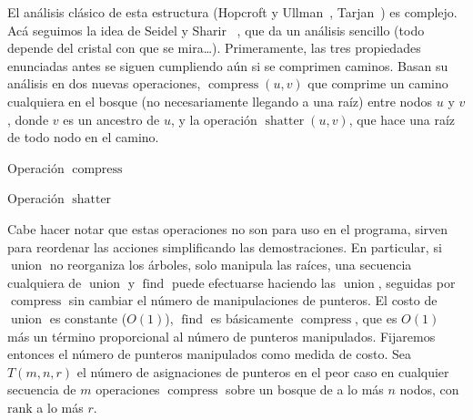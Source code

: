   El análisis clásico de esta estructura
  (Hopcroft y Ullman~\cite{hopcroft73:_set_merging_algorithm},
   Tarjan~\cite{tarjan75:_union-find_analysis})
  es complejo.
  Acá seguimos la idea de Seidel y Sharir~%
    \cite{seidel05:_top_down_analysis_path_compr},
  que da un análisis sencillo
  (todo depende del cristal con que se mira\ldots).
  Primeramente,
  las tres propiedades enunciadas antes se siguen cumpliendo
  aún si se comprimen caminos.
  Basan su análisis en dos nuevas operaciones,
  \(\operatorname{compress}(u, v)\)
  que comprime un camino cualquiera en el bosque
  (no necesariamente llegando a una raíz)
  entre nodos \(u\) y \(v\),
  donde \(v\) es un ancestro de \(u\),
  y la operación \(\operatorname{shatter}(u, v)\),
  que hace una raíz de todo nodo en el camino.
  \begin{algorithm}[ht]
    \DontPrintSemicolon\Indp

    \caption{Operación \(\operatorname{compress}\)}
    \label{alg:uf-compress}
  \end{algorithm}
  \begin{algorithm}[ht]
    \DontPrintSemicolon\Indp

    \caption{Operación \(\operatorname{shatter}\)}
    \label{alg:uf-shatter}
  \end{algorithm}
  Cabe hacer notar que estas operaciones no son para uso en el programa,
  sirven para reordenar las acciones simplificando las demostraciones.
  En particular,
  si \(\operatorname{union}\) no reorganiza los árboles,
  solo manipula las raíces,
  una secuencia cualquiera
  de \(\operatorname{union}\) y \(\operatorname{find}\)
  puede efectuarse haciendo las \(\operatorname{union}\),
  seguidas por \(\operatorname{compress}\)
  sin cambiar el número de manipulaciones de punteros.
  El costo de \(\operatorname{union}\) es constante
  (\(O(1)\)),
  \(\operatorname{find}\) es básicamente \(\operatorname{compress}\),
  que es \(O(1)\)
  más un término proporcional al número de punteros manipulados.
  Fijaremos entonces el número de punteros manipulados
  como medida de costo.
  Sea \(T(m, n, r)\) el número de asignaciones de punteros en el peor caso
  en cualquier secuencia de \(m\) operaciones \(\operatorname{compress}\)
  sobre un bosque de a lo más \(n\) nodos,
  con \(\mathrm{rank}\) a lo más \(r\).

